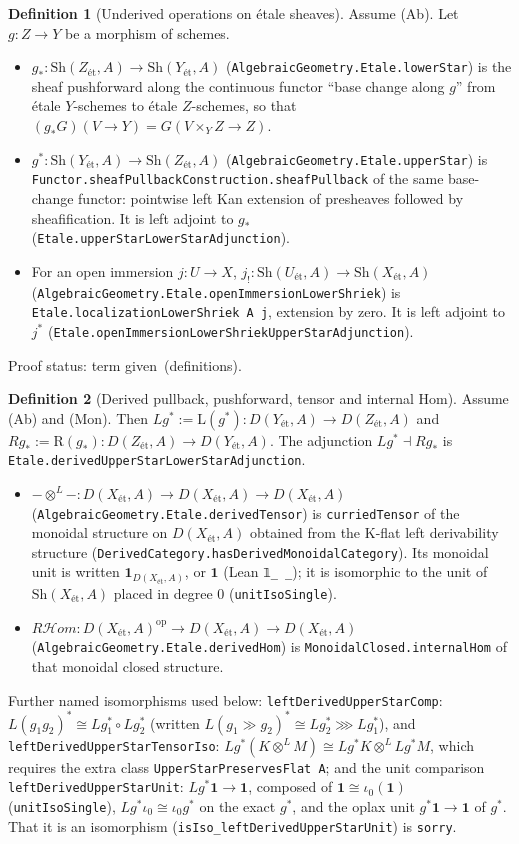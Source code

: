 \documentclass[10pt]{article}
\theoremstyle{definition}
\newtheorem{definition}{Definition}[section]
\theoremstyle{remark}
\newcommand{\lean}[1]{{\small\nolinkurl{#1}}}
\newcommand{\leanu}[1]{{\small\texttt{#1}}}
\newcommand{\SORRY}{\textcolor{red!70!black}{\texttt{sorry}}}
\newcommand{\PROVED}{\textcolor{green!40!black}{term given}}
\newcommand{\DEF}{definition}
\newcommand{\et}{\text{\'et}}
\newcommand{\Sh}[2]{\mathrm{Sh}({#1}_{\et},#2)}
\newcommand{\D}[2]{D({#1}_{\et},#2)}
\newcommand{\one}{\mathbf 1}
\newcommand{\Lt}{\otimes^{L}}
\newcommand{\RHom}{R\mathcal{H}om}
\begin{document}
\begin{definition}[Underived operations on étale sheaves]\label{def:sf-operations-underived}
Assume (Ab). Let $g:Z\to Y$ be a morphism of schemes.
\begin{itemize}
\item $g_*:\Sh{Z}{A}\to\Sh{Y}{A}$ (\lean{AlgebraicGeometry.Etale.lowerStar}) is the
sheaf pushforward along the continuous functor ``base change along $g$'' from étale
$Y$-schemes to étale $Z$-schemes, so that $(g_*G)(V\to Y)=G(V\times_YZ\to Z)$.
\item $g^*:\Sh{Y}{A}\to\Sh{Z}{A}$ (\lean{AlgebraicGeometry.Etale.upperStar}) is
\lean{Functor.sheafPullbackConstruction.sheafPullback} of the same base-change functor:
pointwise left Kan extension of presheaves followed by sheafification. It is left
adjoint to $g_*$ (\lean{Etale.upperStarLowerStarAdjunction}).
\item For an open immersion $j:U\to X$, $j_!:\Sh{U}{A}\to\Sh{X}{A}$
(\lean{AlgebraicGeometry.Etale.openImmersionLowerShriek}) is
\leanu{Etale.localizationLowerShriek A j}, extension by zero. It is left adjoint to $j^*$
(\lean{Etale.openImmersionLowerShriekUpperStarAdjunction}).
\end{itemize}
Proof status: \PROVED\ (\DEF s).
\end{definition}

\begin{definition}[Derived pullback, pushforward, tensor and internal Hom]\label{def:derived-ops}
Assume (Ab) and (Mon). Then $Lg^*:=\mathrm{L}(g^*):\D{Y}{A}\to\D{Z}{A}$ and
$Rg_*:=\mathrm{R}(g_*):\D{Z}{A}\to\D{Y}{A}$. The adjunction $Lg^*\dashv Rg_*$ is
\lean{Etale.derivedUpperStarLowerStarAdjunction}.
\begin{itemize}
\item $-\Lt-:\D{X}{A}\to\D{X}{A}\to\D{X}{A}$
(\lean{AlgebraicGeometry.Etale.derivedTensor}) is \lean{curriedTensor} of the monoidal
structure on $\D{X}{A}$ obtained from the K-flat left derivability structure
(\lean{DerivedCategory.hasDerivedMonoidalCategory}). Its monoidal unit is written $\one_{\D{X}{A}}$, or $\one$
(Lean \leanu{𝟙\_ \_}); it is isomorphic to the unit of $\Sh{X}{A}$ placed in degree $0$ (\lean{unitIsoSingle}).
\item $\RHom:\D{X}{A}^{\mathrm{op}}\to\D{X}{A}\to\D{X}{A}$
(\lean{AlgebraicGeometry.Etale.derivedHom}) is \lean{MonoidalClosed.internalHom} of that
monoidal closed structure.
\end{itemize}
Further named isomorphisms used below:
\lean{leftDerivedUpperStarComp}: $L(g_1g_2)^*\cong Lg_1^*\circ Lg_2^*$ (written
$L(g_1\gg g_2)^*\cong Lg_2^*\ggg Lg_1^*$), and \lean{leftDerivedUpperStarTensorIso}:
$Lg^*(K\Lt M)\cong Lg^*K\Lt Lg^*M$, which requires the extra class
\leanu{UpperStarPreservesFlat A}; and the unit comparison \lean{leftDerivedUpperStarUnit}: $Lg^*\one\to\one$, composed of
$\one\cong\iota_0(\one)$ (\lean{unitIsoSingle}), $Lg^*\iota_0\cong\iota_0g^*$ on the exact $g^*$, and the oplax unit
$g^*\one\to\one$ of $g^*$. That it is an isomorphism (\lean{isIso_leftDerivedUpperStarUnit}) is \SORRY.
\end{definition}
\end{document}
